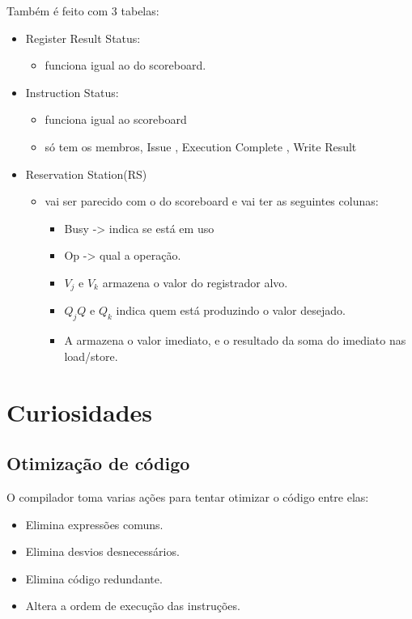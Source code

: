 \documentclass[a4paper]{article}
\begin{document}
Também é feito com 3 tabelas:
\begin{itemize}
    \item Register Result Status:
        \begin{itemize}
            \item funciona igual ao do scoreboard.
        \end{itemize}
    \item Instruction Status:
        \begin{itemize}
            \item funciona igual ao scoreboard
            \item só tem os membros, Issue , Execution Complete , Write Result
        \end{itemize}
    \item Reservation Station(RS)
        \begin{itemize}
            \item vai ser parecido com o do scoreboard e vai ter as seguintes colunas:
                \begin{itemize}
                    \item Busy -> indica se está em uso
                    \item Op   -> qual a operação.
                    \item $V_j$ e $V_k$ armazena o valor do registrador alvo.
                    \item $Q_jQ$ e $Q_k$ indica quem está produzindo o valor desejado.
                    \item A armazena o valor imediato, e o resultado da soma do imediato nas load/store.
                \end{itemize}
        \end{itemize}
\end{itemize}


\section{Curiosidades}
\subsection{Otimização de código}
    O compilador toma varias ações para tentar otimizar o código entre elas:
    \begin{itemize}
        \item Elimina expressões comuns.
        \item Elimina desvios desnecessários.
        \item Elimina código redundante.
        \item Altera a ordem de execução das instruções.
    \end{itemize}
\end{document}
